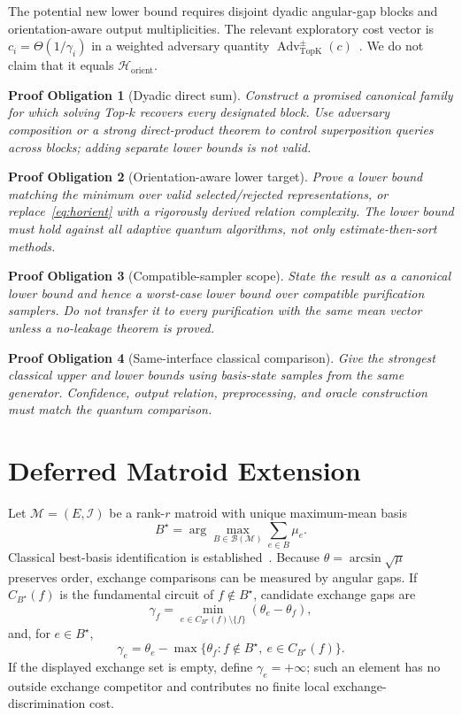 \documentclass[10pt]{article}
\newtheorem{obligation}{Proof Obligation}
\theoremstyle{definition}
\newcommand{\TopK}{\operatorname{TopK}}
\newcommand{\Adv}{\operatorname{Adv}^{\pm}}
\newcommand{\cB}{\mathcal{B}}
\newcommand{\cM}{\mathcal{M}}
\begin{document}
The potential new lower bound requires disjoint dyadic angular-gap blocks and
orientation-aware output multiplicities.  The relevant exploratory cost vector
is $c_i=\Theta(1/\gamma_i)$ in a weighted adversary quantity
$\Adv_{\TopK}(c)$~\cite{lee2011stateconversion,reichardt2011reflections}.  We do
not claim that it equals $\mathcal H_{\mathrm{orient}}$.

\begin{obligation}[Dyadic direct sum]
Construct a promised canonical family for which solving Top-$k$ recovers every
designated block.  Use adversary composition or a strong direct-product theorem
to control superposition queries across blocks; adding separate lower bounds is
not valid.
\end{obligation}

\begin{obligation}[Orientation-aware lower target]
Prove a lower bound matching the minimum over valid selected/rejected
representations, or replace~\eqref{eq:horient} with a rigorously derived relation
complexity.  The lower bound must hold against all adaptive quantum algorithms,
not only estimate-then-sort methods.
\end{obligation}

\begin{obligation}[Compatible-sampler scope]
State the result as a canonical lower bound and hence a worst-case lower bound
over compatible purification samplers.  Do not transfer it to every purification
with the same mean vector unless a no-leakage theorem is proved.
\end{obligation}

\begin{obligation}[Same-interface classical comparison]
Give the strongest classical upper and lower bounds using basis-state samples
from the same generator.  Confidence, output relation, preprocessing, and oracle
construction must match the quantum comparison.
\end{obligation}

\section{Deferred Matroid Extension}

Let $\cM=(E,\mathcal I)$ be a rank-$r$ matroid with unique maximum-mean basis
\[
B^\star=\arg\max_{B\in\cB(\cM)}\sum_{e\in B}\mu_e.
\]
Classical best-basis identification is established~\cite{chen2016matroid}.
Because $\theta=\arcsin\sqrt{\mu}$ preserves order, exchange comparisons can be
measured by angular gaps.  If $C_{B^\star}(f)$ is the fundamental circuit of
$f\notin B^\star$, candidate exchange gaps are
\[
\gamma_f=\min_{e\in C_{B^\star}(f)\setminus\{f\}}(\theta_e-\theta_f),
\]
and, for $e\in B^\star$,
\[
\gamma_e=\theta_e-
\max\{\theta_f:f\notin B^\star,\ e\in C_{B^\star}(f)\}.
\]
If the displayed exchange set is empty, define $\gamma_e=+\infty$; such an
element has no outside exchange competitor and contributes no finite local
exchange-discrimination cost.
\end{document}
